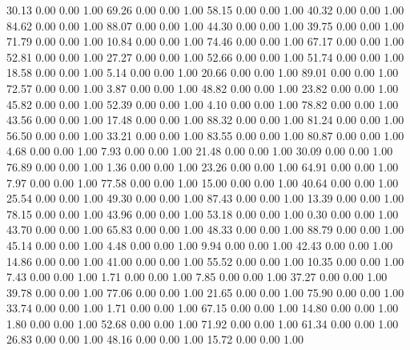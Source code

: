    30.13   0.00   0.00   1.00
   69.26   0.00   0.00   1.00
   58.15   0.00   0.00   1.00
   40.32   0.00   0.00   1.00
   84.62   0.00   0.00   1.00
   88.07   0.00   0.00   1.00
   44.30   0.00   0.00   1.00
   39.75   0.00   0.00   1.00
   71.79   0.00   0.00   1.00
   10.84   0.00   0.00   1.00
   74.46   0.00   0.00   1.00
   67.17   0.00   0.00   1.00
   52.81   0.00   0.00   1.00
   27.27   0.00   0.00   1.00
   52.66   0.00   0.00   1.00
   51.74   0.00   0.00   1.00
   18.58   0.00   0.00   1.00
    5.14   0.00   0.00   1.00
   20.66   0.00   0.00   1.00
   89.01   0.00   0.00   1.00
   72.57   0.00   0.00   1.00
    3.87   0.00   0.00   1.00
   48.82   0.00   0.00   1.00
   23.82   0.00   0.00   1.00
   45.82   0.00   0.00   1.00
   52.39   0.00   0.00   1.00
    4.10   0.00   0.00   1.00
   78.82   0.00   0.00   1.00
   43.56   0.00   0.00   1.00
   17.48   0.00   0.00   1.00
   88.32   0.00   0.00   1.00
   81.24   0.00   0.00   1.00
   56.50   0.00   0.00   1.00
   33.21   0.00   0.00   1.00
   83.55   0.00   0.00   1.00
   80.87   0.00   0.00   1.00
    4.68   0.00   0.00   1.00
    7.93   0.00   0.00   1.00
   21.48   0.00   0.00   1.00
   30.09   0.00   0.00   1.00
   76.89   0.00   0.00   1.00
    1.36   0.00   0.00   1.00
   23.26   0.00   0.00   1.00
   64.91   0.00   0.00   1.00
    7.97   0.00   0.00   1.00
   77.58   0.00   0.00   1.00
   15.00   0.00   0.00   1.00
   40.64   0.00   0.00   1.00
   25.54   0.00   0.00   1.00
   49.30   0.00   0.00   1.00
   87.43   0.00   0.00   1.00
   13.39   0.00   0.00   1.00
   78.15   0.00   0.00   1.00
   43.96   0.00   0.00   1.00
   53.18   0.00   0.00   1.00
    0.30   0.00   0.00   1.00
   43.70   0.00   0.00   1.00
   65.83   0.00   0.00   1.00
   48.33   0.00   0.00   1.00
   88.79   0.00   0.00   1.00
   45.14   0.00   0.00   1.00
    4.48   0.00   0.00   1.00
    9.94   0.00   0.00   1.00
   42.43   0.00   0.00   1.00
   14.86   0.00   0.00   1.00
   41.00   0.00   0.00   1.00
   55.52   0.00   0.00   1.00
   10.35   0.00   0.00   1.00
    7.43   0.00   0.00   1.00
    1.71   0.00   0.00   1.00
    7.85   0.00   0.00   1.00
   37.27   0.00   0.00   1.00
   39.78   0.00   0.00   1.00
   77.06   0.00   0.00   1.00
   21.65   0.00   0.00   1.00
   75.90   0.00   0.00   1.00
   33.74   0.00   0.00   1.00
    1.71   0.00   0.00   1.00
   67.15   0.00   0.00   1.00
   14.80   0.00   0.00   1.00
    1.80   0.00   0.00   1.00
   52.68   0.00   0.00   1.00
   71.92   0.00   0.00   1.00
   61.34   0.00   0.00   1.00
   26.83   0.00   0.00   1.00
   48.16   0.00   0.00   1.00
   15.72   0.00   0.00   1.00
